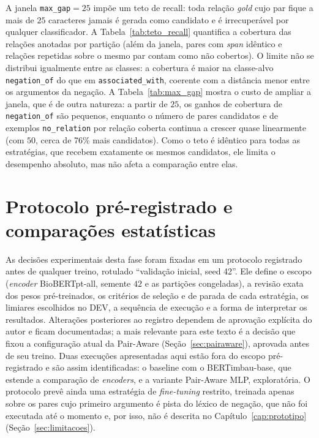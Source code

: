 A janela \texttt{max\_gap}$=25$ impõe um teto de recall: toda relação \emph{gold}
cujo par fique a mais de $25$ caracteres jamais é gerada como candidato e é
irrecuperável por qualquer classificador. A Tabela~\ref{tab:teto_recall} quantifica a
cobertura das relações anotadas por partição (além da janela, pares com \emph{span}
idêntico e relações repetidas sobre o mesmo par contam como não cobertos). O limite
não se distribui igualmente entre as classes: a cobertura é maior na classe-alvo
\texttt{negation\_of} do que em \texttt{associated\_with}, coerente com a
distância menor entre os argumentos da negação. A Tabela~\ref{tab:max_gap} mostra o
custo de ampliar a janela, que é de outra natureza: a partir de $25$, os ganhos de
cobertura de \texttt{negation\_of} são pequenos, enquanto o número de pares
candidatos e de exemplos \texttt{no\_relation} por relação coberta continua a crescer
quase linearmente (com $50$, cerca de 76\% mais candidatos). Como o teto é idêntico
para todas as estratégias, que recebem exatamente os mesmos candidatos, ele limita o
desempenho absoluto, mas não afeta a comparação entre elas.





\section{Protocolo pré-registrado e comparações estatísticas}
\label{sec:protocolo}

As decisões experimentais desta fase foram fixadas em um protocolo registrado antes
de qualquer treino, rotulado ``validação inicial, seed 42''. Ele define o escopo
(\emph{encoder} BioBERTpt-all, semente $42$ e as partições congeladas), a revisão
exata dos pesos pré-treinados, os critérios de seleção e de parada de cada
estratégia, os limiares escolhidos no DEV, a sequência de execução e a forma de
interpretar os resultados. Alterações posteriores ao registro dependem de aprovação
explícita do autor e ficam documentadas; a mais relevante para este texto é a decisão
que fixou a configuração atual da Pair-Aware (Seção~\ref{sec:pairaware}), aprovada
antes de seu treino. Duas execuções apresentadas aqui estão fora do escopo
pré-registrado e são assim identificadas: o baseline com o BERTimbau-base, que
estende a comparação de \emph{encoders}, e a variante Pair-Aware MLP, exploratória.
O protocolo prevê ainda uma estratégia de \emph{fine-tuning} restrito, treinada apenas
sobre os pares cujo primeiro argumento é pista do léxico de negação, que não foi
executada até o momento e, por isso, não é descrita no Capítulo~\ref{cap:prototipo}
(Seção~\ref{sec:limitacoes}).

